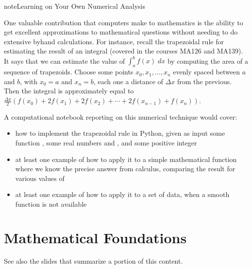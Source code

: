 \documentclass[letterpaper,10pt,english]{jupyterBook}
\begin{document}
\begin{sphinxadmonition}{note}{Learning on Your Own \sphinxhyphen{} Numerical Analysis}

\sphinxAtStartPar
One valuable contribution that computers make to mathematics is the ability to get excellent approximations to mathematical questions without needing to do extensive by\sphinxhyphen{}hand calculations.  For instance, recall the trapezoidal rule for estimating the result of an integral (covered in the courses MA126 and MA139).  It says that we can estimate the value of
\(\int_a^b f(x)\;dx\)
by computing the area of a sequence of trapezoids.  Choose some points \(x_0,x_1,\ldots,x_n\) evenly spaced between \(a\) and \(b\), with \(x_0=a\) and \(x_n=b\), each one a distance of \(\Delta x\) from the previous.  Then the integral is approximately equal to
\(\frac{\Delta x}{2}\left(f(x_0)+2f(x_1)+2f(x_2)+\cdots+2f(x_{n-1})+f(x_n)\right)\).
\end{sphinxadmonition}

\sphinxAtStartPar
A computational notebook reporting on this numerical technique would cover:
\begin{itemize}
\item {} 
\sphinxAtStartPar
how to implement the trapezoidal rule in Python, given as input some function , some real numbers  and , and some positive integer 

\item {} 
\sphinxAtStartPar
at least one example of how to apply it to a simple mathematical function  where we know the precise answer from calculus, comparing the result for various values of 

\item {} 
\sphinxAtStartPar
at least one example of how to apply it to a set of data, when a smooth function  is not available

\end{itemize}


\chapter{Mathematical Foundations}
\label{\detokenize{chapter-2-mathematical-foundations:mathematical-foundations}}\label{\detokenize{chapter-2-mathematical-foundations::doc}}
\sphinxAtStartPar
See also the slides that summarize a portion of this content.
\end{document}
